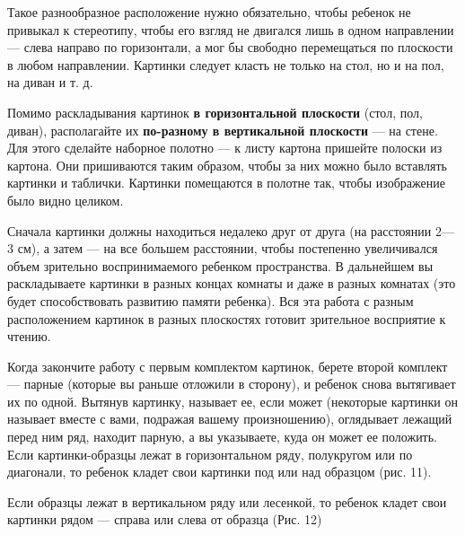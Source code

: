 \documentclass{book}
\begin{document}
Такое разнообразное расположение нужно обязательно, чтобы ребенок не
привыкал к стереотипу, чтобы его взгляд не двигался лишь в одном
направлении --- слева направо по горизонтали, а мог бы свободно
перемещаться по плоскости в любом направлении. Картинки следует класть
не только на стол, но и на пол, на диван и т. д.

Помимо раскладывания картинок \textbf{в горизонтальной плоскости} (стол,
пол, диван), располагайте их \textbf{по-разному в вертикальной
плоскости} --- на стене. Для этого сделайте наборное полотно --- к листу
картона пришейте полоски из картона. Они пришиваются таким образом,
чтобы за них можно было вставлять картинки и таблички. Картинки
помещаются в полотне так, чтобы изображение было видно целиком.

Сначала картинки должны находиться недалеко друг от друга (на расстоянии
2---3 см), а затем --- на все большем расстоянии, чтобы постепенно
увеличивался объем зрительно воспринимаемого ребенком пространства. В
дальнейшем вы раскладываете картинки в разных концах комнаты и даже в
разных комнатах (это будет способствовать развитию памяти ребенка). Вся
эта работа с разным расположением картинок в разных плоскостях готовит
зрительное восприятие к чтению.


Когда закончите работу с первым комплектом картинок, берете второй
комплект --- парные (которые вы раньше отложили в сторону), и ребенок
снова вытягивает их по одной. Вытянув картинку, называет ее, если может
(некоторые картинки он называет вместе с вами, подражая вашему
произношению), оглядывает лежащий перед ним ряд, находит парную, а вы
указываете, куда он может ее положить. Если картинки-образцы лежат в
горизонтальном ряду, полукругом или по диагонали, то ребенок кладет свои
картинки под или над образцом (рис. 11).

Если образцы лежат в вертикальном ряду или лесенкой, то ребенок кладет свои картинки рядом --- справа или слева от образца (Рис. 12)
\end{document}
